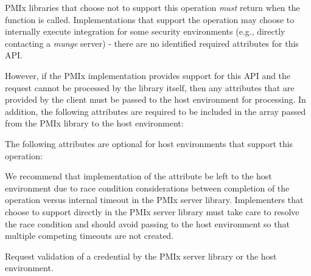 \reqattrstart
\ac{PMIx} libraries that choose not to support this operation \textit{must} return  when the function is called. Implementations that support the operation may choose to internally execute integration for some security environments (e.g., directly contacting a \textit{munge} server) - there are no identified required attributes for this \ac{API}.

However, if the \ac{PMIx} implementation provides support for this \ac{API} and the request cannot be processed by the library itself, then any attributes that are provided by the client must be passed to the host environment for processing. In addition, the following attributes are required to be included in the  array passed from the \ac{PMIx} library to the host environment:


\reqattrend

\optattrstart
The following attributes are optional for host environments that support this operation:


\optattrend

\adviceimplstart
We recommend that implementation of the  attribute be left to the host environment due to race condition considerations between completion of the operation versus internal timeout in the \ac{PMIx} server library. Implementers that choose to support  directly in the \ac{PMIx} server library must take care to resolve the race condition and should avoid passing  to the host environment so that multiple competing timeouts are not created.
\adviceimplend


\descr

Request validation of a credential by the \ac{PMIx} server library or the host environment.




